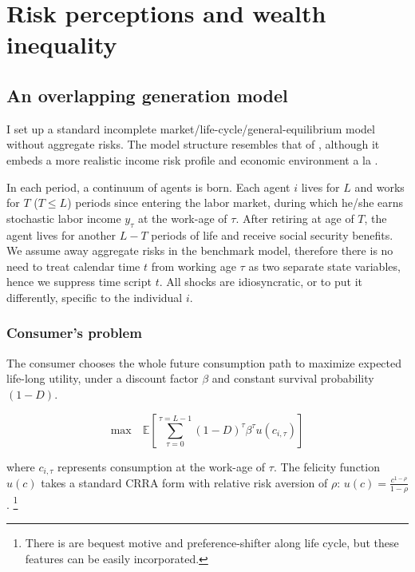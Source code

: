 \hypertarget{model_pe}{%
\section{Risk perceptions and wealth inequality}\label{model_pe}}

\subsection{An overlapping generation model}


I set up a standard incomplete market/life-cycle/general-equilibrium model without aggregate risks. The model structure resembles that of \cite{huggett1996wealth}, although it embeds a more realistic income risk profile and economic environment a la \cite{carroll1997nature,krueger2016macroeconomics,carroll2017distribution}. 

In each period, a continuum of agents is born. Each agent $i$ lives for $L$ and works for $T$ ($T\leq L$) periods since entering the labor market, during which he/she earns stochastic labor income \(y_\tau\) at the
work-age of \(\tau\). After retiring at age of \(T\), the agent lives
for another \(L-T\) periods of life and receive social security benefits. We assume away aggregate risks in the benchmark model, therefore there is no need to treat calendar time $t$ from working age $\tau$ as two separate state variables, hence we suppress time script $t$. All shocks are idiosyncratic, or to put it differently, specific to the individual $i$. 


\subsubsection{Consumer's problem}

The consumer chooses the whole future consumption path to maximize
expected life-long utility, under a discount factor $\beta$ and constant survival probability $(1-D)$. 

\begin{equation}
\textrm{max}\quad  \mathbb{E}\left[\sum^{\tau=L-1}_{\tau=0}(1-D)^\tau\beta^\tau u(c_{i,\tau})\right] 
\end{equation}


where $c_{i,\tau}$ represents consumption at the work-age of $\tau$. The
felicity function $u(c)$ takes a standard CRRA form with relative risk
aversion of $\rho$: $u(c) = \frac{c^{1-\rho}}{1-\rho}$.  \footnote{There is are bequest motive and
preference-shifter along life cycle, but these features can be easily incorporated.}


